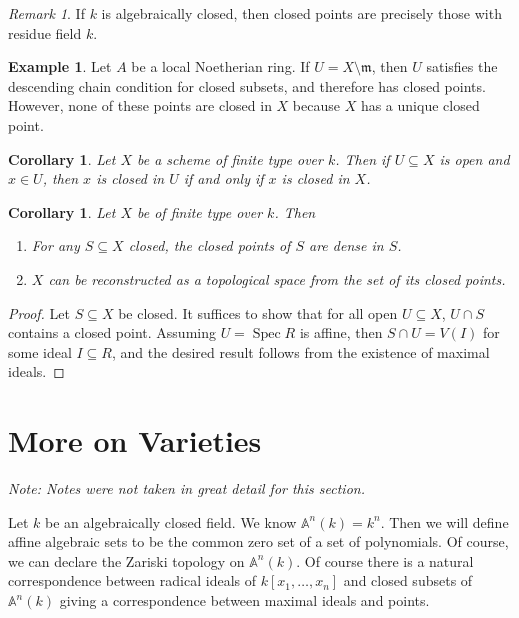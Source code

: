 \documentclass[leqno, openany]{memoir}
\newtheorem{cor}[thm]{Corollary}
\theoremstyle{definition}
\newtheorem{exm}[thm]{Example}
\theoremstyle{remark}
\newtheorem{rmk}[thm]{Remark}
\theoremstyle{plain}
\theoremstyle{definition}
\theoremstyle{remark}
\newcommand{\A}{\mathbb{A}}
\newcommand{\mf}[1]{\mathfrak{#1}}
\DeclareMathOperator{\Spec}{Spec}
\begin{document}
\begin{rmk} If $k$ is algebraically closed, then closed points are precisely
those with residue field $k$.  \end{rmk}

\begin{exm} Let $A$ be a local Noetherian ring. If $U = X \setminus \mf{m}$,
    then $U$ satisfies the descending chain condition for closed subsets, and
    therefore has closed points. However, none of these points are closed in
    $X$ because $X$ has a unique closed point.  \end{exm}

\begin{cor} Let $X$ be a scheme of finite type over $k$. Then if $U \subseteq
X$ is open and $x \in U$, then $x$ is closed in $U$ if and only if $x$ is
closed in $X$.  \end{cor}

\begin{cor} Let $X$ be of finite type over $k$. Then \begin{enumerate} \item
    For any $S \subseteq X$ closed, the closed points of $S$ are dense in $S$.
\item $X$ can be reconstructed as a topological space from the set of its
    closed points.  \end{enumerate} \end{cor}

\begin{proof} Let $S \subseteq X$ be closed. It suffices to show that for all
    open $U \subseteq X$, $U \cap S$ contains a closed point. Assuming $U =
    \Spec R$ is affine, then $S \cap U = V(I)$ for some ideal $I \subseteq R$,
    and the desired result follows from the existence of maximal ideals.
\end{proof}

\section{More on Varieties}%

\textit{Note: Notes were not taken in great detail for this section.} 

Let $k$ be an algebraically closed field. We know $\A^n(k) = k^n$. Then we will
define affine algebraic sets to be the common zero set of a set of polynomials.
Of course, we can declare the Zariski topology on $\A^n(k)$. Of course there is
a natural correspondence between radical ideals of $k[x_1, \ldots, x_n]$ and
closed subsets of $\A^n(k)$ giving a correspondence between maximal ideals and
points.
\end{document}
